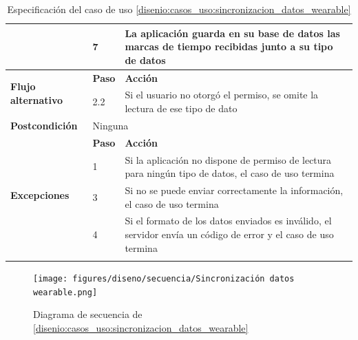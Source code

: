 \begin{table}[h]
\begin{tabularx}{\textwidth}{|l|l|X|}
                    \cline{2-3} & 7 & La aplicación guarda en su base de datos las marcas de tiempo recibidas junto a su tipo de datos \\     
                    \hline
                    \multirow{2}{*}{\textbf{Flujo alternativo}} & \textbf{Paso} & \textbf{Acción} \\
                    \cline{2-3} & 2.2 & Si el usuario no otorgó el permiso, se omite la lectura de ese tipo de dato \\
                    \hline
                    \textbf{Postcondición} & \multicolumn{2}{|X|}{Ninguna} \\
                    \hline
                    \multirow{4}{*}{\textbf{Excepciones}} & \textbf{Paso} & \textbf{Acción} \\
                    \cline{2-3} & 1 & Si la aplicación no dispone de permiso de lectura para ningún tipo de datos, el caso de uso termina \\
                    \cline{2-3} & 3 & Si no se puede enviar correctamente la información, el caso de uso termina \\
                    \cline{2-3} & 4 & Si el formato de los datos enviados es inválido, el servidor envía un código de error y el caso de uso termina \\
                    \hline
                    \caption{Especificación del caso de uso \ref{disenio:casos_uso:sincronizacion_datos_wearable}}
                    \label{tabla:casos_uso:sincronizacion_datos_wearable}
                \end{tabularx}
            \end{table}

            \begin{figure}[h]
                \centering
                \texttt{[image: figures/diseno/secuencia/Sincronización datos wearable.png]}
                \caption{Diagrama de secuencia de \ref{disenio:casos_uso:sincronizacion_datos_wearable}}
                \label{figure:diagrama_secuencia:acceso_datos}
            \end{figure}
            
